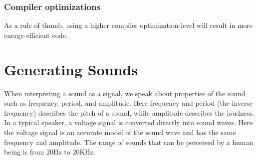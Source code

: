 \subsubsection{Compiler optimizations}
As a rule of thumb, using a higher compiler optimization-level will result in more energy-efficient code.


%


\section{Generating Sounds}
When interpreting a sound as a signal, we speak about properties of the sound such as frequency, period, and amplitude. Here frequency and period (the inverse frequency) describes the pitch of a sound, while amplitude describes the loudness. In a typical speaker, a voltage signal is converted directly into sound waves. Here the voltage signal is an accurate model of the sound wave and has the same frequency and amplitude. The range of sounds that can be perceived by a human being is from 20Hz to 20KHz.\cite{compendium}
